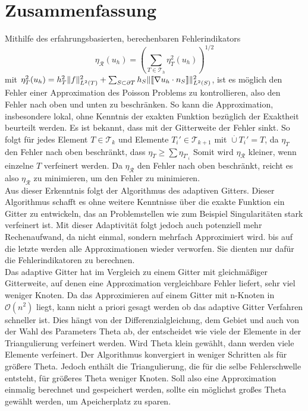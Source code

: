 \chapter*{Zusammenfassung}

Mithilfe des erfahrungsbasierten, berechenbaren Fehlerindikators
\[
\eta_\mathscr{R}(u_h)=\left(\sum_{T\in\mathscr{T}_h} \eta^2_T(u_h)\right)^{1/2}
\]
mit
$
\eta^2_T(u_h) = h^2_T\|f\|^2_{L^2(T)} + \sum_{S\subset\partial T} h_S\|\llbracket \nabla u_h \cdot n_S\rrbracket\|^2_{L^2(S)} 
$, ist es möglich den Fehler einer Approximation des Poisson Problems zu kontrollieren, also den Fehler nach oben und unten zu beschränken. So kann die Approximation, insbesondere lokal, ohne Kenntnis der exakten Funktion bezüglich der Exaktheit beurteilt werden. Es ist bekannt, dass mit der Gitterweite der Fehler sinkt. So folgt für jedes Element $T \in \mathscr{T}_k$ und Elemente $T_i'\in \mathscr{T}_{k+1}$ mit $\overset{.}{\cup} T_i' =T$, da $\eta_T$ den Fehler nach oben beschränkt, dass $\eta_T\geq \sum \eta_{T'_i}$ Somit wird $\eta_\mathscr{R}$ kleiner, wenn einzelne $T$ verfeinert werden. Da $\eta_\mathscr{R}$ den Fehler nach oben beschränkt, reicht es also $\eta_\mathscr{R}$ zu minimieren, um den Fehler zu minimieren. \\
Aus dieser Erkenntnis folgt der Algorithmus des adaptiven Gitters. Dieser Algorithmus schafft es ohne weitere Kenntnisse über die exakte Funktion ein Gitter zu entwickeln, das an Problemstellen wie zum Beispiel Singularitäten stark verfeinert ist. Mit dieser Adaptivität folgt jedoch auch potenziell mehr Rechenaufwand, da nicht einmal, sondern mehrfach Approximiert wird. bis auf die letzte werden alle Approximationen wieder verworfen. Sie dienten nur dafür die Fehlerindikatoren zu berechnen.\\
Das adaptive Gitter hat im Vergleich zu einem Gitter mit gleichmäßiger Gitterweite, auf denen eine Approximation vergleichbare Fehler liefert, sehr viel weniger Knoten. Da das Approximieren auf einem Gitter mit n-Knoten in $\mathcal{O}(n^2)$ liegt, kann nicht a priori gesagt werden ob das adaptive Gitter Verfahren schneller ist. Dies hängt von der Differenzialgleichung, dem Gebiet und auch von der Wahl des Parameters Theta ab, der entscheidet wie viele der Elemente in der Triangulierung verfeinert werden. Wird Theta klein gewählt, dann werden viele Elemente verfeinert. Der Algorithmus konvergiert in weniger Schritten als für größere Theta. Jedoch enthält die Triangulierung, die für die selbe Fehlerschwelle entsteht, für größeres Theta weniger Knoten. Soll also eine Approximation einmalig berechnet und gespeichert werden, sollte ein möglichst großes Theta gewählt werden, um Apeicherplatz zu sparen. \\
